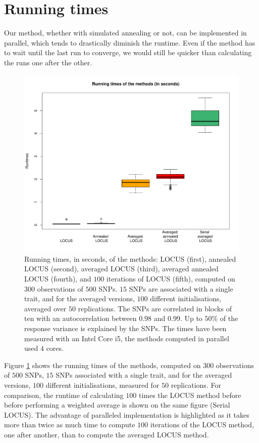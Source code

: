 \documentclass[a4paper, 11pt]{report}
\numberwithin{equation}{chapter}
\begin{document}
\section{Running times}

Our method, whether with simulated annealing or not, can be implemented in parallel, which tends to drastically diminish the runtime. Even if the method has to wait until the last run to converge, we would still be quicker than calculating the runs one after the other.

\begin{figure}[h]
\centering
\includegraphics[width=5in,bb= 0 0 600 540]{images/runtime.pdf}

\caption{\label{fig:runtime} Running times, in seconds, of the methods: LOCUS (first), annealed LOCUS (second), averaged LOCUS (third), averaged annealed LOCUS (fourth), and $100$ iterations of LOCUS (fifth), computed on $300$ observations of $500$ SNPs. $15$ SNPs are associated with a single trait, and for the averaged versions, $100$ different initialisations, averaged over $50$ replications. The SNPs are correlated in blocks of ten with an autocorrelation between $0.98$ and $0.99$. Up to $50\%$ of the response variance is explained by the SNPs. The times have been measured with an Intel Core i5, the methods computed in parallel used $4$ cores.}
\end{figure}

Figure \ref{fig:runtime} shows the running times of the methods, computed on $300$ observations of $500$ SNPs, $15$ SNPs associated with a single trait, and for the averaged versions, $100$ different initialisations, measured for $50$ replications. For comparison, the runtime of calculating $100$ times the LOCUS method before before performing a weighted average is shown on the same figure (Serial LOCUS). The advantage of paralleled implementation is highlighted as it takes more than twice as much time to compute $100$ iterations of the LOCUS method, one after another, than to compute the averaged LOCUS method.
\end{document}
